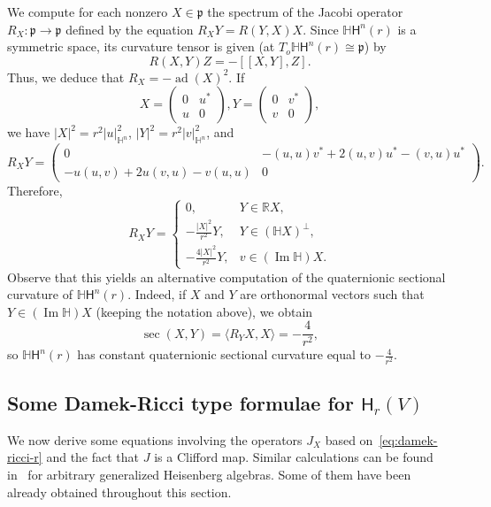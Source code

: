 \documentclass[12pt, a4paper,draft]{amsart}
\newcommand{\g}{\mathfrak}
\newcommand{\R}{\mathbb{R}}
\renewcommand{\H}{\mathbb{H}}
\theoremstyle{remark}
\begin{document}
We compute for each nonzero $X\in \g{p}$ the spectrum of the Jacobi operator $R_{X}\colon \g{p}\to \g{p}$ defined by the equation $R_{X}Y=R(Y,X)X$.
Since $\H\mathsf{H}^{n}(r)$ is a symmetric space, its curvature tensor is given (at $T_{o}\H\mathsf{H}^{n}(r)\cong \g{p}$) by
\begin{equation*}
	R(X,Y)Z=-[[X,Y],Z].
\end{equation*}
Thus, we deduce that $R_{X}=-\operatorname{ad}(X)^{2}$.
If
\[
X=\left(
\begin{array}{c|c}
	0 & u^{*} \\
	\hline
	u & 0
\end{array}
\right),
Y=\left(
\begin{array}{c|c}
	0 & v^{*} \\
	\hline
	v & 0
\end{array}
\right),
\]
we have $\lvert X\rvert^{2}=r^{2}\lvert u \rvert^{2}_{\H^{n}}$, $\lvert Y\rvert^{2}=r^{2}\lvert v \rvert^{2}_{\H^{n}}$, and
\[
	R_{X}Y=\left(
	\begin{array}{c|c}
		0 & -(u,u)v^{*}+2(u,v)u^{*}-(v,u)u^{*} \\
		\hline
		-u(u,v)+2u(v,u)-v(u,u) & 0
	\end{array}
	\right).
\]
Therefore,
\[
	R_{X}Y=
	\begin{cases}
		0, & Y\in \R X, \\
		-\frac{\lvert X \rvert^{2}}{r^{2}}Y, & Y\in (\H X)^{\perp}, \\
		-\frac{4 \lvert X \rvert^{2}}{r^{2}} Y, & v\in (\operatorname{Im}\H)X.
	\end{cases}
\]
Observe that this yields an alternative computation of the quaternionic sectional curvature of $\H\mathsf{H}^{n}(r)$.
Indeed, if $X$ and $Y$ are orthonormal vectors such that $Y\in (\operatorname{Im}\H)X$ (keeping the notation above), we obtain
\[
	\operatorname{sec}(X,Y)=\langle R_{Y}X,X \rangle=-\frac{4}{r^{2}},
\]
so $\H\mathsf{H}^{n}(r)$ has constant quaternionic sectional curvature equal to $-\frac{4}{r^{2}}$.

\subsection{Some Damek-Ricci type formulae for $\mathsf{H}_{r}(V)$}

We now derive some equations involving the operators $J_{X}$ based on~\eqref{eq:damek-ricci-r} and the fact that $J$ is a Clifford map.
Similar calculations can be found in~\cite[Chapter~3]{BerndtTricerriVanhecke} for arbitrary generalized Heisenberg algebras.
Some of them have been already obtained throughout this section.
\end{document}
